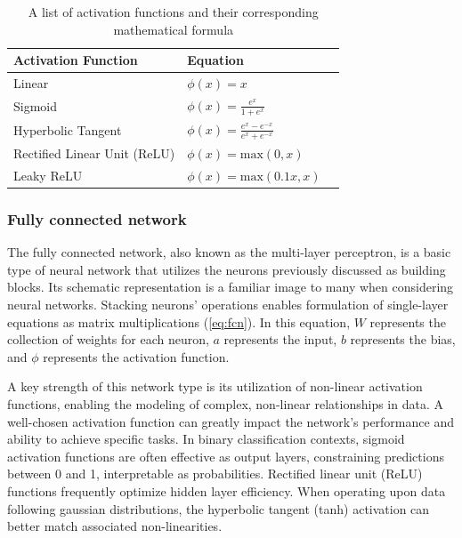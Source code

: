 \begin{table}[H]
    \caption{A list of activation functions and their corresponding mathematical formula} \label{tab:activation-functions}
    \begin{tabularx}{\columnwidth}{|X|X|X|}
        \hline
        {\bf Activation Function} & {\bf Equation} \\ \hline 
        Linear & $\phi(x) = x$ \\\hline
        Sigmoid & $\phi(x) = \frac{e^{x}}{1 + e^{x}}$\\ \hline 
        Hyperbolic Tangent & $\phi(x) = \frac{e^x - e^{-x}}{e^{x} + e^{-x}}$\\ \hline 
        Rectified Linear Unit (ReLU) & $\phi(x) = \text{max}(0,x)$\\ \hline 
        Leaky ReLU & $\phi(x) = \text{max}(0.1x,x)$ \\ \hline 
    \end{tabularx}
\end{table}

\subsubsection{Fully connected network}
The fully connected network, also known as the multi-layer perceptron, is a basic type of neural network that utilizes the neurons previously discussed as building blocks.
Its schematic representation is a familiar image to many when considering neural networks.
Stacking neurons' operations enables formulation of single-layer equations as matrix multiplications (\cref{eq:fcn}).
In this equation, $W$ represents the collection of weights for each neuron, $a$ represents the input, $b$ represents the bias, and $\phi$ represents the activation function.

A key strength of this network type is its utilization of non-linear activation functions, enabling the modeling of complex, non-linear relationships in data.
A well-chosen activation function can greatly impact the network's performance and ability to achieve specific tasks.
In binary classification contexts, sigmoid activation functions are often effective as output layers, constraining predictions between 0 and 1, interpretable as probabilities.
Rectified linear unit (ReLU) functions frequently optimize hidden layer efficiency.
When operating upon data following gaussian distributions, the hyperbolic tangent (tanh) activation can better match associated non-linearities.

